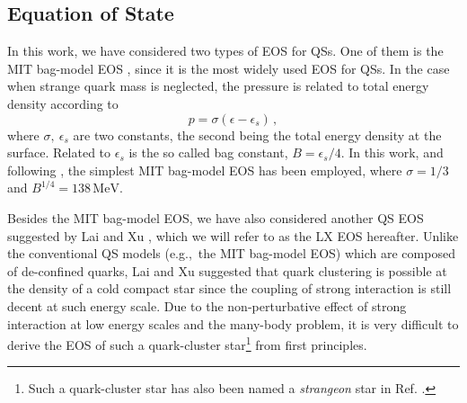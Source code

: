 \documentclass[twocolumn,superscriptaddress,showpacs,prd,aps,amsmath,amssymb,nofootinbib]{revtex4-1}
\newcommand{\eg}{e.g.,~}
\begin{document}
\subsection{Equation of State}
\label{sec:eos}

In this work, we have considered two types of EOS for QSs. One of them is
the MIT bag-model EOS \cite{chodos1974}, since it is the most widely used
EOS for QSs. In the case when strange quark mass is neglected, the
pressure is related to total energy density according to
\begin{equation}
p=\sigma (\epsilon-\epsilon_s) \, ,
\label{eq:mit_gen}
\end{equation}
where $\sigma,\ \epsilon_s$ are two constants, the second being the total
energy density at the surface. Related to $\epsilon_s$ is the so called
bag constant, $B=\epsilon_s/4$. In this work, and following
\cite{limousin2005}, the simplest MIT bag-model EOS has been employed,
where $\sigma=1/3$ and $B^{1/4}=138\,\mathrm{MeV}$.

Besides the MIT bag-model EOS, we have also considered another QS EOS
suggested by Lai and Xu \cite{lai2009}, which we will refer to as the LX
EOS hereafter. Unlike the conventional QS models (\eg the MIT bag-model
EOS) which are composed of de-confined quarks, Lai and Xu \cite{lai2009}
suggested that quark clustering is possible at the density of a cold
compact star since the coupling of strong interaction is still decent at
such energy scale. Due to the non-perturbative effect of strong
interaction at low energy scales and the many-body problem, it is very
difficult to derive the EOS of such a quark-cluster star\footnote{Such a
  quark-cluster star has also been named a {\em strangeon} star in
  Ref. \cite{lai2017}.} from first principles.
\end{document}
